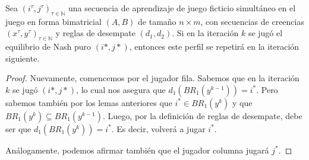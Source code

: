 \begin{theorem}
    Sea $(i^\tau, j^\tau)_{\tau \in \mathbb{N}}$ una secuencia de aprendizaje de juego ficticio simultáneo en el juego en forma bimatricial $(A, B)$ de tamaño $n \times m$, con secuencias de creencias $(x^\tau, y^\tau)_{\tau \in \mathbb{N}}$ y reglas de desempate $(d_1, d_2)$. Si en la iteración $k$ se jugó el equilibrio de Nash puro $(i*, j*)$, entonces este perfil se repetirá en la iteración siguiente.
\end{theorem}

\begin{proof}
    Nuevamente, comencemos por el jugador fila. Sabemos que en la iteración $k$ se jugó $(i*, j*)$, lo cual nos asegura que $d_1(BR_1(y^{k-1})) = i^*$. Pero sabemos también por los lemas anteriores que $i^* \in BR_1(y^{k})$ y que $BR_1(y^{k}) \subseteq BR_1(y^{k-1})$. Luego, por la definición de reglas de desempate, debe ser que $d_1(BR_1(y^k)) = i^*$. Es decir, volverá a jugar $i^*$.

    Análogamente, podemos afirmar también que el jugador columna jugará $j^*$.
\end{proof}




